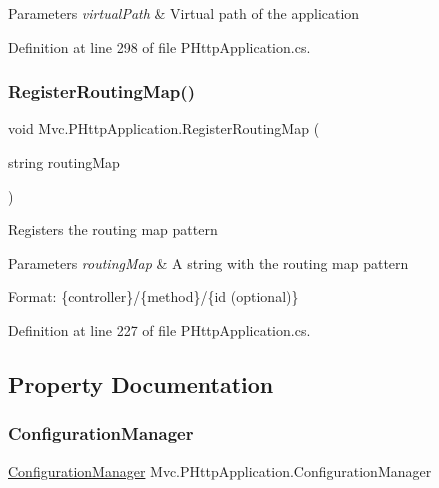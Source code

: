 \begin{DoxyParams}{Parameters}
{\em virtual\+Path} & Virtual path of the application\\
\hline
\end{DoxyParams}


Definition at line 298 of file P\+Http\+Application.\+cs.

\mbox{\label{class_mvc_1_1_p_http_application_a3a4aae05eadf7da66bdd37f96c48f79f}} 
\subsubsection{\texorpdfstring{Register\+Routing\+Map()}{RegisterRoutingMap()}}
{\footnotesize\ttfamily void Mvc.\+P\+Http\+Application.\+Register\+Routing\+Map (\begin{DoxyParamCaption}\item[{string}]{routing\+Map }\end{DoxyParamCaption})}



Registers the routing map pattern 


\begin{DoxyParams}{Parameters}
{\em routing\+Map} & A string with the routing map pattern\\
\hline
\end{DoxyParams}


Format\+: \{controller\}/\{method\}/\{id (optional)\}

Definition at line 227 of file P\+Http\+Application.\+cs.



\subsection{Property Documentation}
\mbox{\label{class_mvc_1_1_p_http_application_a19b5b22d6422a32d76b113fecda86d88}} 
\subsubsection{\texorpdfstring{Configuration\+Manager}{ConfigurationManager}}
{\footnotesize\ttfamily \hyperlink{class_mvc_1_1_configuration_manager}{Configuration\+Manager} Mvc.\+P\+Http\+Application.\+Configuration\+Manager\hspace{0.3cm}{\ttfamily [get]}}



